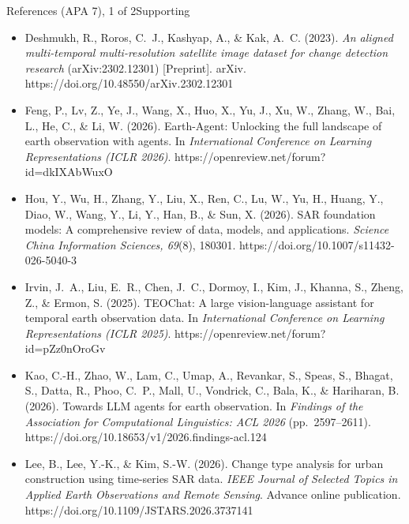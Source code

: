 \documentclass[aspectratio=169,11pt]{beamer}
\begin{document}
\appendix
\begin{frame}[shrink=8]{References (APA 7), 1 of 2}{Supporting}
\scriptsize
\begin{itemize}
\item Deshmukh, R., Roros, C.~J., Kashyap, A., \& Kak, A.~C. (2023). \emph{An aligned multi-temporal multi-resolution satellite image dataset for change detection research} (arXiv:2302.12301) [Preprint]. arXiv. https://doi.org/10.48550/arXiv.2302.12301
\item Feng, P., Lv, Z., Ye, J., Wang, X., Huo, X., Yu, J., Xu, W., Zhang, W., Bai, L., He, C., \& Li, W. (2026). Earth-Agent: Unlocking the full landscape of earth observation with agents. In \emph{International Conference on Learning Representations (ICLR 2026)}. https://openreview.net/forum?id=dkIXAbWuxO
\item Hou, Y., Wu, H., Zhang, Y., Liu, X., Ren, C., Lu, W., Yu, H., Huang, Y., Diao, W., Wang, Y., Li, Y., Han, B., \& Sun, X. (2026). SAR foundation models: A comprehensive review of data, models, and applications. \emph{Science China Information Sciences, 69}(8), 180301. https://doi.org/10.1007/s11432-026-5040-3
\item Irvin, J.~A., Liu, E.~R., Chen, J.~C., Dormoy, I., Kim, J., Khanna, S., Zheng, Z., \& Ermon, S. (2025). TEOChat: A large vision-language assistant for temporal earth observation data. In \emph{International Conference on Learning Representations (ICLR 2025)}. https://openreview.net/forum?id=pZz0nOroGv
\item Kao, C.-H., Zhao, W., Lam, C., Umap, A., Revankar, S., Speas, S., Bhagat, S., Datta, R., Phoo, C.~P., Mall, U., Vondrick, C., Bala, K., \& Hariharan, B. (2026). Towards LLM agents for earth observation. In \emph{Findings of the Association for Computational Linguistics: ACL 2026} (pp.~2597--2611). https://doi.org/10.18653/v1/2026.findings-acl.124
\item Lee, B., Lee, Y.-K., \& Kim, S.-W. (2026). Change type analysis for urban construction using time-series SAR data. \emph{IEEE Journal of Selected Topics in Applied Earth Observations and Remote Sensing}. Advance online publication. https://doi.org/10.1109/JSTARS.2026.3737141
\end{itemize}
\end{frame}
\end{document}

